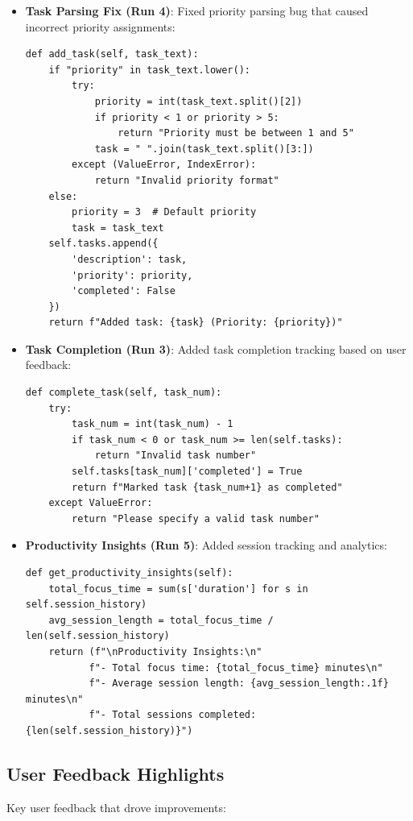 \documentclass{article} %
\begin{document}
\begin{itemize}
    \item \textbf{Task Parsing Fix (Run 4)}: Fixed priority parsing bug that caused incorrect priority assignments:
\begin{verbatim}
def add_task(self, task_text):
    if "priority" in task_text.lower():
        try:
            priority = int(task_text.split()[2])
            if priority < 1 or priority > 5:
                return "Priority must be between 1 and 5"
            task = " ".join(task_text.split()[3:])
        except (ValueError, IndexError):
            return "Invalid priority format"
    else:
        priority = 3  # Default priority
        task = task_text
    self.tasks.append({
        'description': task,
        'priority': priority,
        'completed': False
    })
    return f"Added task: {task} (Priority: {priority})"
\end{verbatim}

    \item \textbf{Task Completion (Run 3)}: Added task completion tracking based on user feedback:
\begin{verbatim}
def complete_task(self, task_num):
    try:
        task_num = int(task_num) - 1
        if task_num < 0 or task_num >= len(self.tasks):
            return "Invalid task number"
        self.tasks[task_num]['completed'] = True
        return f"Marked task {task_num+1} as completed"
    except ValueError:
        return "Please specify a valid task number"
\end{verbatim}

    \item \textbf{Productivity Insights (Run 5)}: Added session tracking and analytics:
\begin{verbatim}
def get_productivity_insights(self):
    total_focus_time = sum(s['duration'] for s in self.session_history)
    avg_session_length = total_focus_time / len(self.session_history)
    return (f"\nProductivity Insights:\n"
           f"- Total focus time: {total_focus_time} minutes\n"
           f"- Average session length: {avg_session_length:.1f} minutes\n"
           f"- Total sessions completed: {len(self.session_history)}")
\end{verbatim}
\end{itemize}

\subsection{User Feedback Highlights}
Key user feedback that drove improvements:
\end{document}
